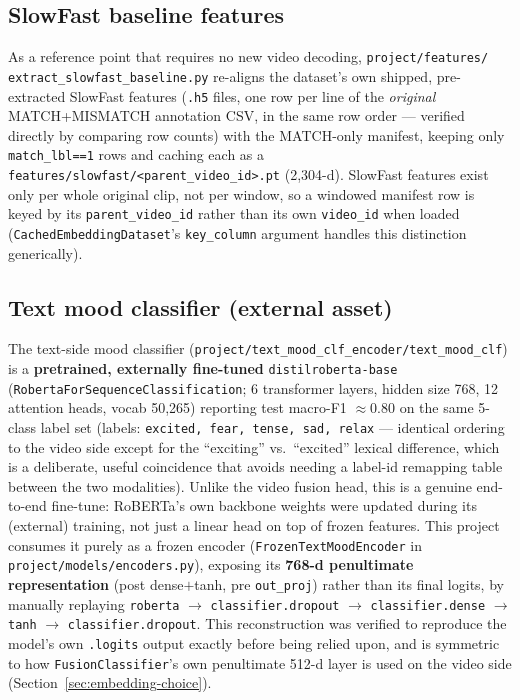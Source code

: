 \documentclass[11pt]{article}
\begin{document}
\subsection{SlowFast baseline features}
As a reference point that requires no new video decoding, \texttt{project/features/}
\texttt{extract\_slowfast\_baseline.py} re-aligns the dataset's own shipped, pre-extracted SlowFast
features (\texttt{.h5} files, one row per line of the \emph{original} MATCH+MISMATCH annotation
CSV, in the same row order --- verified directly by comparing row counts) with the MATCH-only
manifest, keeping only \texttt{match\_lbl==1} rows and caching each as a
\texttt{features/slowfast/<parent\_video\_id>.pt} (2{,}304-d). SlowFast features exist only per
whole original clip, not per window, so a windowed manifest row is keyed by its
\texttt{parent\_video\_id} rather than its own \texttt{video\_id} when loaded
(\texttt{CachedEmbeddingDataset}'s \texttt{key\_column} argument handles this distinction
generically).

\subsection{Text mood classifier (external asset)}
\label{sec:text-encoder}
The text-side mood classifier (\texttt{project/text\_mood\_clf\_encoder/text\_mood\_clf}) is a
\textbf{pretrained, externally fine-tuned} \texttt{distilroberta-base}
(\texttt{RobertaForSequenceClassification}; 6 transformer layers, hidden size 768, 12 attention
heads, vocab 50{,}265) reporting test macro-F1 $\approx 0.80$ on the same 5-class label set
(labels: \texttt{excited, fear, tense, sad, relax} --- identical ordering to the video side except
for the ``exciting'' vs.\ ``excited'' lexical difference, which is a deliberate, useful coincidence
that avoids needing a label-id remapping table between the two modalities). Unlike the video
fusion head, this is a genuine end-to-end fine-tune: RoBERTa's own backbone weights were updated
during its (external) training, not just a linear head on top of frozen features. This project
consumes it purely as a frozen encoder (\texttt{FrozenTextMoodEncoder} in
\texttt{project/models/encoders.py}), exposing its \textbf{768-d penultimate representation}
(post dense$+$tanh, pre \texttt{out\_proj}) rather than its final logits, by manually replaying
\texttt{roberta} $\to$ \texttt{classifier.dropout} $\to$ \texttt{classifier.dense} $\to$
\texttt{tanh} $\to$ \texttt{classifier.dropout}. This reconstruction was verified to reproduce the
model's own \texttt{.logits} output exactly before being relied upon, and is symmetric to how
\texttt{FusionClassifier}'s own penultimate 512-d layer is used on the video side
(Section~\ref{sec:embedding-choice}).
\end{document}

